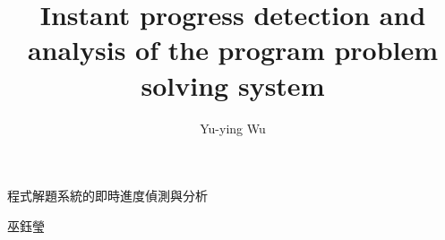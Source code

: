 

\title{Instant progress detection and analysis of the program problem solving system}{程式解題系統的即時進度偵測與分析}
\author{Yu-ying Wu}{巫鈺瑩}
\let\cleardoublepage\clearpage